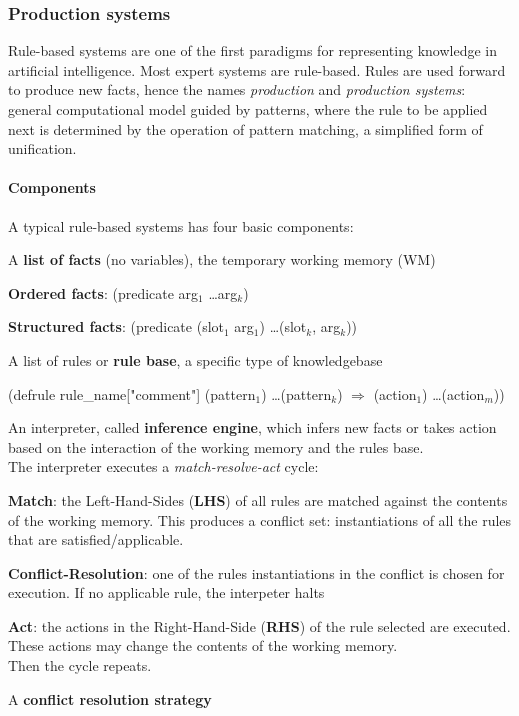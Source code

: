 \documentclass[10pt]{report}
\begin{document}
\subsubsection{Production systems} Rule-based systems are one of the first paradigms for representing knowledge in artificial intelligence. Most expert systems are rule-based. Rules are used forward to produce new facts, hence the names \textit{production} and \textit{production systems}: general computational model guided by patterns, where the rule to be applied next is determined by the operation of pattern matching, a simplified form of unification.
\paragraph{Components} A typical rule-based systems has four basic components:
\begin{list}{}{}
	\item A \textbf{list of facts} (no variables), the temporary working memory (WM)\begin{list}{}{}
		\item \textbf{Ordered facts}: (predicate arg$_1$ \ldots arg$_k$)
		\item \textbf{Structured facts}: (predicate (slot$_1$ arg$_1$) \ldots (slot$_k$, arg$_k$))
	\end{list}
	\item A list of rules or \textbf{rule base}, a specific type of knowledgebase
	\begin{list}{}{}
		\item (defrule rule\_name["comment"] (pattern$_1$) \ldots (pattern$_k$) $\Rightarrow$ (action$_1$) \ldots (action$_m$))
	\end{list}
	\item An interpreter, called \textbf{inference engine}, which infers new facts or takes action based on the interaction of the working memory and the rules base.\\
	The interpreter executes a \textit{match-resolve-act} cycle:
	\begin{list}{}{}
		\item \textbf{Match}: the Left-Hand-Sides (\textbf{LHS}) of all rules are matched against the contents of the working memory. This produces a conflict set: instantiations of all the rules that are satisfied/applicable.
		\item \textbf{Conflict-Resolution}: one of the rules instantiations in the conflict is chosen for execution. If no applicable rule, the interpeter halts
		\item \textbf{Act}: the actions in the Right-Hand-Side (\textbf{RHS}) of the rule selected are executed. These actions may change the contents of the working memory.\\
		Then the cycle repeats.
	\end{list}
	\item A \textbf{conflict resolution strategy}
\end{list}
\end{document}
